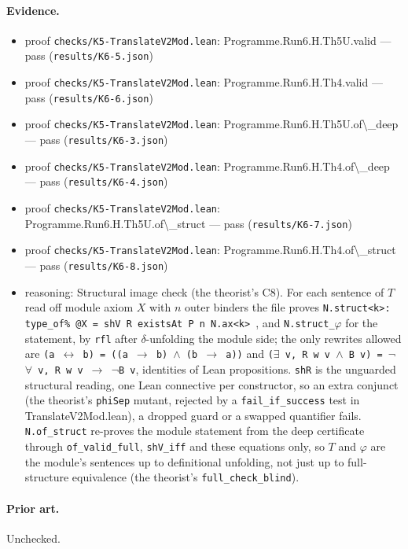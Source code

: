 \documentclass{article}
\begin{document}
\paragraph{Evidence.}
\begin{itemize}
\item proof \texttt{checks/K5-TranslateV2Mod.lean}: Programme.Run6.H.Th5U.valid --- pass (\texttt{results/K6-5.json})
\item proof \texttt{checks/K5-TranslateV2Mod.lean}: Programme.Run6.H.Th4.valid --- pass (\texttt{results/K6-6.json})
\item proof \texttt{checks/K5-TranslateV2Mod.lean}: Programme.Run6.H.Th5U.of\textbackslash{}\_deep --- pass (\texttt{results/K6-3.json})
\item proof \texttt{checks/K5-TranslateV2Mod.lean}: Programme.Run6.H.Th4.of\textbackslash{}\_deep --- pass (\texttt{results/K6-4.json})
\item proof \texttt{checks/K5-TranslateV2Mod.lean}: Programme.Run6.H.Th5U.of\textbackslash{}\_struct --- pass (\texttt{results/K6-7.json})
\item proof \texttt{checks/K5-TranslateV2Mod.lean}: Programme.Run6.H.Th4.of\textbackslash{}\_struct --- pass (\texttt{results/K6-8.json})
\item reasoning: Structural image check (the theorist's C8). For each sentence of $T$ read off module axiom $X$ with $n$ outer binders the file proves \texttt{N.struct\textless{}k\textgreater{}: type\_of\% @X = shV R existsAt P n N.ax\textless{}k\textgreater{} }, and \texttt{N.struct\_$\varphi$} for the statement, by \texttt{rfl} after $\delta$-unfolding the module side; the only rewrites allowed are \texttt{(a $\leftrightarrow$ b) = ((a $\to$ b) $\wedge$ (b $\to$ a))} and \texttt{($\exists$ v, R w v $\wedge$ B v) = $\neg$$\forall$ v, R w v $\to$ $\neg$B v}, identities of Lean propositions. \texttt{shR} is the unguarded structural reading, one Lean connective per constructor, so an extra conjunct (the theorist's \texttt{phiSep} mutant, rejected by a \texttt{fail\_if\_success} test in TranslateV2Mod.lean), a dropped guard or a swapped quantifier fails. \texttt{N.of\_struct} re-proves the module statement from the deep certificate through \texttt{of\_valid\_full}, \texttt{shV\_iff} and these equations only, so $T$ and $\varphi$ are the module's sentences up to definitional unfolding, not just up to full-structure equivalence (the theorist's \texttt{full\_check\_blind}).
\end{itemize}

\paragraph{Prior art.} Unchecked.
\end{document}
